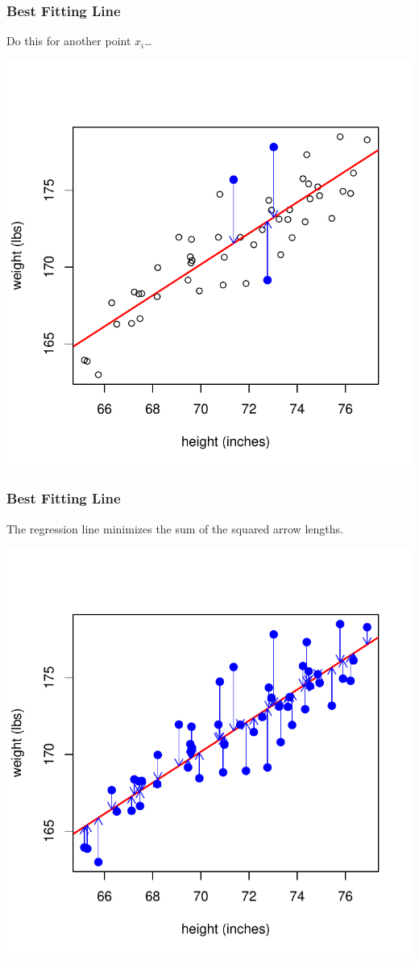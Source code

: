 \documentclass[handout]{beamer}
\newcommand{\blue}[1]{\textcolor{blue2}{#1}}
\begin{document}
\begin{frame}
\frametitle{Best Fitting Line}
Do this for another point $x_i$\ldots
\begin{center}
\includegraphics{figure/lec24-007}
\end{center}
\end{frame}
\begin{frame}
\frametitle{Best Fitting Line}
The regression line minimizes the sum of the \blue{squared} arrow lengths.  
\begin{center}
\includegraphics{figure/lec24-008}
\end{center}
\end{frame}
\end{document}
